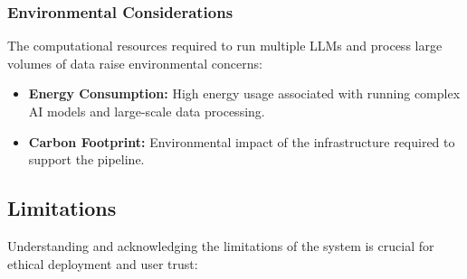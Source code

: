 \subsubsection{Environmental Considerations}\label{subsubsec:environmental-considerations}
The computational resources required to run multiple LLMs and process large volumes of data raise environmental concerns:
\begin{itemize}
    \item \textbf{Energy Consumption:} High energy usage associated with running complex AI models and large-scale data processing.
    \item \textbf{Carbon Footprint:} Environmental impact of the infrastructure required to support the pipeline.
\end{itemize}

\subsection{Limitations}\label{subsec:limitations}
Understanding and acknowledging the limitations of the system is crucial for ethical deployment and user trust:

